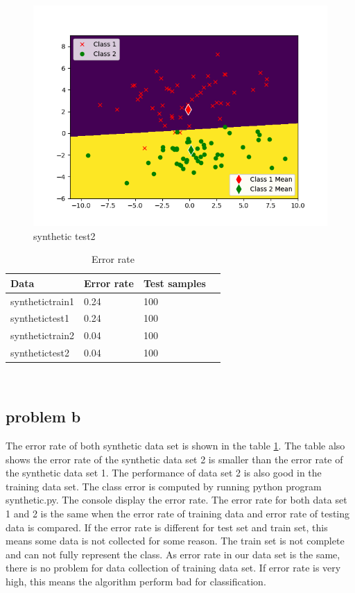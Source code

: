 \documentclass{article}
\begin{document}
	\begin{figure}[hbt!]
		\includegraphics[width=\linewidth]{images/synthetic_test2.png}
		\caption{synthetic test2}
		\label{fig:synthetictest2}
	\end{figure}
		\begin{table}[hbt!]
		\begin{center}
		\begin{tabular}{| l | l | l | p{5cm} |}
		\hline
			Data      & Error rate & Test samples  \\ \hline
			synthetictrain1& 0.24        & 100    \\  \hline
			synthetictest1& 0.24		& 100    \\   \hline
			synthetictrain2& 0.04        & 100    \\  \hline
			synthetictest2& 0.04		& 100    \\   \hline
		\end{tabular}
		\end{center}
	\caption{Error rate}
	\label{table: errorrate}
	\end{table}
	 \\
	\subsection{problem b}
	The error rate of both synthetic data set is shown in the table \ref{table: errorrate}. The table also shows the error rate of the synthetic data set 2 is smaller than the error rate of the synthetic data set 1. The performance of data set 2 is also good in the training data set. The class error is computed by running python program synthetic.py. The console display the error rate. The error rate for both data set 1 and 2 is the same when the error rate of training  data and error rate of testing data is compared. If the error rate is different for test set and train set, this means some data is not collected for some reason. The train set is not complete and can not fully represent the class. As error rate in our data set is the same, there is no problem for data collection of training data set. If error rate is very high, this means the algorithm perform bad for classification.    
\end{document}

